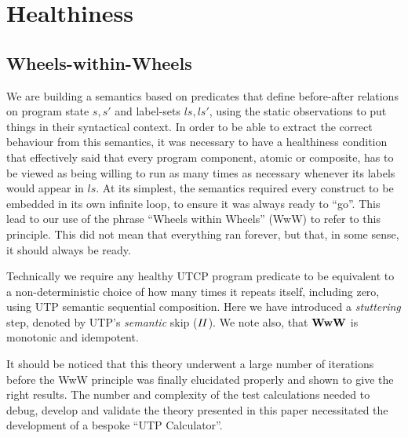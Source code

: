 \section{Healthiness}\label{sec:health}


\subsection{Wheels-within-Wheels}\label{ssec:WwW}

We are building a semantics based on predicates
that define before-after relations on program state $s,s'$
and label-sets $ls,ls'$, using the static observations
to put things in their syntactical context.
In order to be able to extract the correct behaviour from
this semantics,
it was necessary to have a healthiness condition
that effectively said that every program component,
atomic or composite, has to be viewed as being
willing to run as many times as necessary
whenever its labels would appear in $ls$.
At its simplest,
the semantics required every construct to be
embedded in its own infinite loop,
to ensure it was always ready to ``go''.
This lead to our use of the phrase ``Wheels within Wheels''
(WwW) to refer to this principle.
This did not mean that everything ran forever,
but that, in some sense, it should always be ready.

Technically we require any healthy UTCP program predicate
to be equivalent to  a non-deterministic choice
of how many times it repeats itself, including zero,
using UTP semantic sequential composition.
 \noindent
Here we have introduced a \emph{stuttering} step,
denoted by UTP's \emph{semantic} skip ($\mathit{II}$).
We note also, that $\mathbf{WwW}$ is monotonic and idempotent.

It should be noticed that this theory underwent
a large number of iterations before the WwW principle was finally
elucidated properly and shown to give the right results.
The number and complexity of the test calculations needed to debug,
develop and validate the theory presented in this paper
necessitated the development of a bespoke ``UTP Calculator''\cite{DBLP:conf/utp/Butterfield16}.

